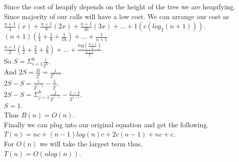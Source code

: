 \documentclass{article}
\begin{document}
Since the cost of heapify depends on the height of the tree we are heapifying. Since majority 
of our calls will have a low cost. We can arrange our cost as\\
$\frac{n + 1}{4}(x) + \frac{n + 1}{8}(2x) + \frac{n + 1}{16}(3x) + ... + 1(c (log_{2}(n + 1)))$.\\
$(n + 1)(\frac{1}{4} + \frac{1}{8} + \frac{1}{16}) + ... + \frac{1}{n + 1}$\\
$\frac{n + 1}{2}(\frac{1}{2} + \frac{2}{4} + \frac{3}{8}) + ... + \frac{log(\frac{n + 1}{2})}{\frac{n + 1}{2}}$\\
So $S = \Sigma_{i = 1}^{h} \frac{i}{2^{h}}$.\\
And $2S = \frac{2i}{2^{i}} = \frac{i}{2^{h - 1}}$.\\
$2S - S = \frac{i}{2^{i - 1}} - \frac{i}{2^{i}}$.\\
$2S - S = \Sigma_{j = 1}^{h} \frac{j}{2^{j - 1}} - \frac{j - 1}{2^{j - 1}}$.\\
$S = 1$.\\
Thus $B(n) = O(n)$.\\

Finally we can plug into our original equation and get the following.\\
$T(n) = nc + (n-1)log(n)c + 2c(n - 1) + nc + c$.\\
For $O(n)$ we will take the largest term thus,\\
$T(n) = O(nlog(n))$.\\
\end{document}
